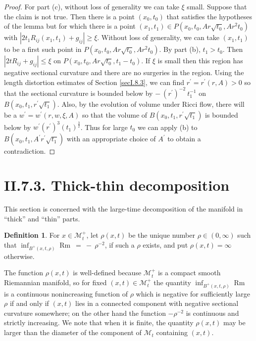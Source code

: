 \documentclass[12pt]{amsart}
\newcommand{\M}{{\mathcal M}}
\newcommand{\Rm}{\operatorname{Rm}}
\numberwithin{equation}{section}
\theoremstyle{plain}
\theoremstyle{definition}
\newtheorem{definition}[equation]{Definition}
\theoremstyle{remark}
\begin{document}
\begin{proof}
For part (c), without loss of generality we can take $\xi$ small.
Suppose that the claim is not true. Then there is a point $(x_0, t_0)$
that satisfies the hypotheses of the lemma but for which there is a point
$\left(x_1, t_1 \right) \in P(x_0, t_0, Ar\sqrt{t_0},
Ar^2 t_0)$ with $|2 t_1 R_{ij}(x_1, t_1) + g_{ij}| \ge \xi$.
Without loss of generality, we can take $(x_1, t_1)$ to be a first
such point in $P(x_0, t_0, Ar\sqrt{t_0}, Ar^2 t_0)$. By part (b),
$t_1 > t_0$. Then $|2 t R_{ij} + g_{ij}| \le \xi$ on
$P(x_0, t_0, Ar\sqrt{t_0}, t_1 -  t_0)$. If $\xi$ is small then this region has
negative sectional curvature and there are no
surgeries in the region. Using the length distortion estimates of
Section \ref{secI.8.3}, we can find
$r^\prime = r^\prime(r, A)>0$ so that the sectional curvature is bounded below
by $- \: (r^\prime)^{-2} \: t_1^{-1}$ on
$B(x_0, t_1, r^\prime \sqrt{t_1})$. Also, by the evolution of volume under
Ricci flow, there will be a $w^\prime = 
w^\prime(r, w, \xi, A)$ so that
the volume of   $B(x_0, t_1, r^\prime \sqrt{t_1})$ is bounded below by
$w^\prime (r^\prime)^3 (t_1)^{\frac32}$. Thus for large $t_0$ we can apply
(b) to $B(x_0, t_1, A^\prime r^\prime \sqrt{t_1})$ with an appropriate choice of
$A^\prime$
to obtain a contradiction.
\end{proof}

\section{II.7.3. Thick-thin decomposition}

This section is concerned with the large-time decomposition of the
manifold in ``thick'' and ``thin'' parts.

\begin{definition}
For $x \in \M_t^+$,
let $\rho(x,t)$ be the unique number $\rho\in (0,\infty)$ such that 
$\inf_{B^+(x,t, \rho)} \Rm \: = \: - \: \rho^{-2}$, if such a $\rho$ exists,
and put $\rho(x,t)=\infty$ otherwise.   
\end{definition}
The function $\rho(x,t)$ is well-defined because $\M_t^+$ is a compact smooth
Riemannian manifold, so for fixed 
$(x,t)\in\M_t^+$ the quantity
$\inf_{B^+(x,t,\rho)} \Rm$ 
is a continuous nonincreasing function of $\rho$ which is negative
for sufficiently large $\rho$ if and only if $(x,t)$ lies in a connected component
with negative sectional curvature somewhere; on the other hand the function $-\rho^{-2}$ is 
continuous and  strictly increasing.  We note that when it is finite, 
the quantity $\rho(x,t)$ may be larger than the diameter of the component
of $\M_t$ containing $(x,t)$. 
\end{document}
